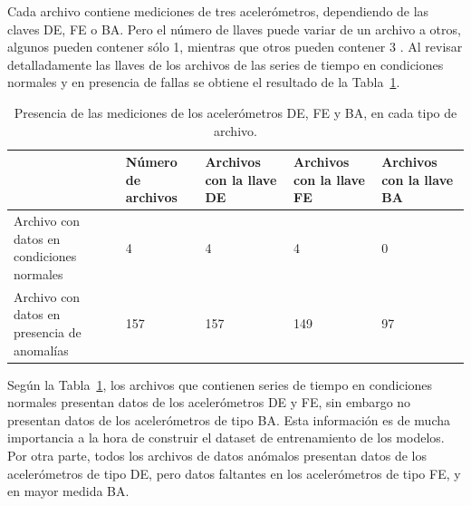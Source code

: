 \documentclass[11pt,a4paper,spanish]{book}
\numberwithin{equation}{chapter}
\numberwithin{figure}{chapter}
\begin{document}
Cada archivo contiene mediciones de tres acelerómetros, dependiendo de las claves DE, 
FE o BA. Pero el número de llaves puede variar de un archivo a otros, algunos pueden 
contener sólo 1, mientras que otros pueden contener 3 \cite{rigas2024marine}. 
Al revisar detalladamente las llaves de los archivos de las series de tiempo en 
condiciones normales y en presencia de fallas  se obtiene el resultado de la 
Tabla~\ref{tab:tab1keys}. 


\begin{table}[h]
\centering
\footnotesize
\renewcommand{\arraystretch}{1.5} %
\begin{tabularx}{\textwidth}{|l|X|X|X|X|}
    \hline
    \textbf{} & 
    \textbf{Número de archivos} & 
    \textbf{Archivos con la llave DE} & 
    \textbf{Archivos con la llave FE} & 
    \textbf{Archivos con la llave BA} \\
    \hline
    Archivo con datos en condiciones normales & 4 & 4 & 4 & 0 \\
    \hline
    Archivo con datos en presencia de anomalías & 157 & 157 & 149 & 97 \\
    \hline
\end{tabularx}
\caption{Presencia de las mediciones de los acelerómetros DE, FE y BA, en cada tipo de archivo.}
\label{tab:tab1keys}
\end{table}



Según la Tabla~\ref{tab:tab1keys}, los archivos que contienen series de tiempo en 
condiciones normales presentan datos de los acelerómetros DE y FE, sin embargo no 
presentan datos de los acelerómetros de tipo BA. Esta información es de mucha 
importancia a la hora de construir el dataset de entrenamiento de los modelos. 
Por otra parte, todos los archivos de datos anómalos presentan datos de los 
acelerómetros de tipo DE, pero datos faltantes en los acelerómetros de tipo FE, y 
en mayor medida BA. 
\end{document}
